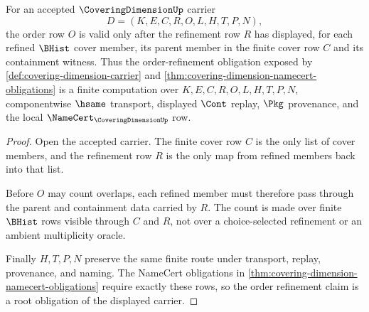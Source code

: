 \begin{theorem}
\label{thm:coveringdimension-order-refinement-obligation}
For an accepted $\CoveringDimensionUp$ carrier
$$
D=(K,E,C,R,O,L,H,T,P,N),
$$
the order row $O$ is valid only after the refinement row $R$ has displayed, for each refined $\BHist$ cover member, its parent member in the finite cover row $C$ and its containment witness. Thus the order-refinement obligation exposed by \autoref{def:covering-dimension-carrier} and \autoref{thm:covering-dimension-namecert-obligations} is a finite computation over $K,E,C,R,O,L,H,T,P,N$, componentwise $\hsame$ transport, displayed $\Cont$ replay, $\Pkg$ provenance, and the local $\NameCert_{\CoveringDimensionUp}$ row.
\end{theorem}
\begin{proof}
Open the accepted carrier. The finite cover row $C$ is the only list of cover members, and the refinement row $R$ is the only map from refined members back into that list.

Before $O$ may count overlaps, each refined member must therefore pass through the parent and containment data carried by $R$. The count is made over finite $\BHist$ rows visible through $C$ and $R$, not over a choice-selected refinement or an ambient multiplicity oracle.

Finally $H,T,P,N$ preserve the same finite route under transport, replay, provenance, and naming. The NameCert obligations in \autoref{thm:covering-dimension-namecert-obligations} require exactly these rows, so the order refinement claim is a root obligation of the displayed carrier.
\end{proof}

